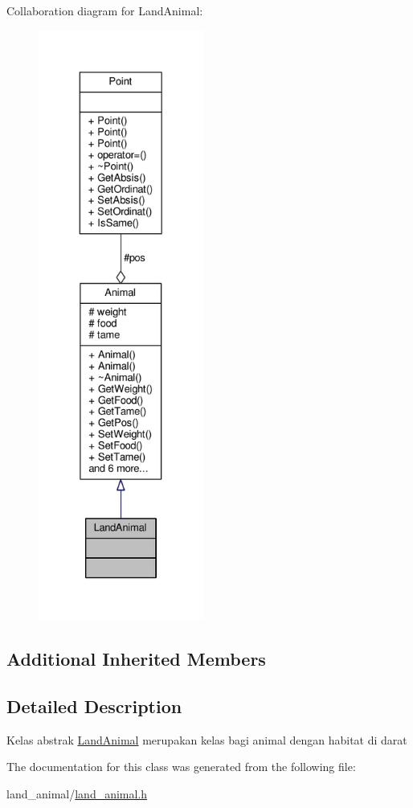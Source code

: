 Collaboration diagram for Land\+Animal\+:
\nopagebreak
\begin{figure}[H]
\begin{center}
\leavevmode
\includegraphics[height=550pt]{classLandAnimal__coll__graph}
\end{center}
\end{figure}
\subsection*{Additional Inherited Members}


\subsection{Detailed Description}
Kelas abstrak \hyperlink{classLandAnimal}{Land\+Animal} merupakan kelas bagi animal dengan habitat di darat 

The documentation for this class was generated from the following file\+:\begin{DoxyCompactItemize}
\item 
land\+\_\+animal/\hyperlink{land__animal_8h}{land\+\_\+animal.\+h}\end{DoxyCompactItemize}
